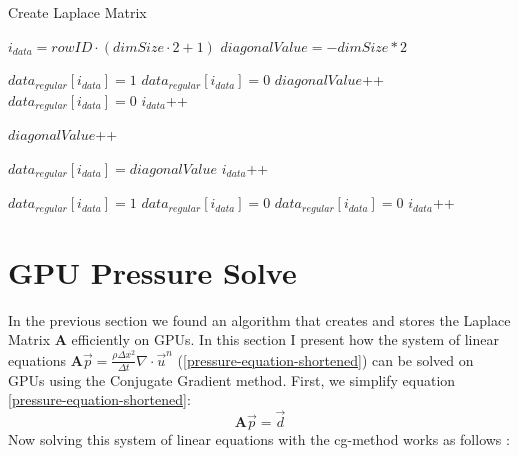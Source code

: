 \begin{algorithm}
\caption{Create Laplace Matrix }\label{laplace-matrix-generation}
\begin{algorithmic}[1]
	\State $i_{data} = rowID \cdot (dimSize \cdot 2 + 1)$
	\State $diagonalValue = - dimSize * 2$
	
	\State {}
			\State $data_{regular}[i_{data}] = 1$
			\State $data_{regular}[i_{data}] = 0$
			\State $diagonalValue$++
			\State $data_{regular}[i_{data}] = 0$
		\EndIf
		\State $i_{data}$++
	\EndFor
	
	\State {}
			\State $diagonalValue$++
		\EndIf
	\EndFor
	
	\State {}
	\State $data_{regular}[i_{data}] = diagonalValue$
	\State $i_{data}$++
	
	\State {}
			\State $data_{regular}[i_{data}] = 1$
			\State $data_{regular}[i_{data}] = 0$
			\State $data_{regular}[i_{data}] = 0$
		\EndIf
		\State $i_{data}$++
	\EndFor
\EndProcedure
\end{algorithmic}
\end{algorithm}



\newpage
\section{GPU Pressure Solve}
In the previous section we found an algorithm that creates and stores the Laplace Matrix \textbf{A} efficiently on GPUs. In this section I present how the system of linear equations $\mathbf{A}\vec{p} = \frac{\rho \Delta x^2}{\Delta t}\nabla \cdot \vec{u}^n$ (\ref{pressure-equation-shortened}) can be solved on GPUs using the Conjugate Gradient method. First, we simplify equation \ref{pressure-equation-shortened}:
\begin{equation}
	\mathbf{A}\vec{p} = \vec{d} 
\end{equation}
Now solving this system of linear equations with the cg-method works as follows \parencite{hestenes1952methods}:

